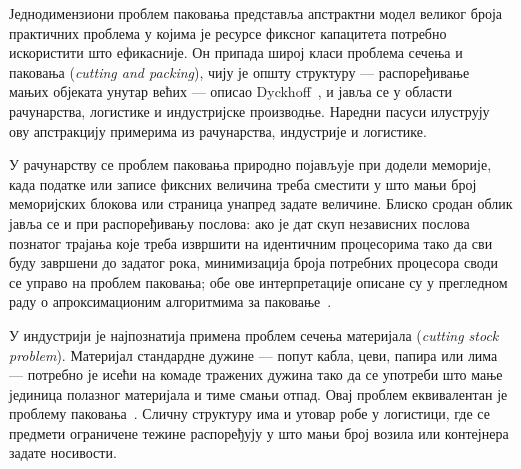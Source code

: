 Једнодимензиони проблем паковања представља апстрактни модел великог броја практичних
проблема у којима је ресурсе фиксног капацитета потребно искористити што ефикасније. Он
припада широј класи проблема сечења и паковања
(\foreignlanguage{english}{\emph{cutting and packing}}), чију је општу структуру ---
распоређивање мањих објеката унутар већих --- описао Dyckhoff~\cite{dyckhoff1990}, и јавља
се у области рачунарства, логистике и индустријске производње. Наредни пасуси илуструју ову апстракцију примерима из рачунарства, индустрије
и логистике.

У рачунарству се проблем паковања природно појављује при додели меморије, када податке
или записе фиксних величина треба сместити у што мањи број меморијских блокова или
страница унапред задате величине. Блиско сродан облик јавља се и при распоређивању
послова: ако је дат скуп независних послова познатог трајања које треба извршити на
идентичним процесорима тако да сви буду завршени до задатог рока, минимизација броја
потребних процесора своди се управо на проблем паковања; обе ове интерпретације описане
су у прегледном раду о апроксимационим алгоритмима за паковање~\cite{coffman1984}.

У индустрији је најпознатија примена проблем сечења материјала
(\foreignlanguage{english}{\emph{cutting stock problem}}). Материјал стандардне дужине
--- попут кабла, цеви, папира или лима --- потребно је исећи на комаде тражених дужина
тако да се употреби што мање јединица полазног материјала и тиме смањи отпад. Овај
проблем еквивалентан је проблему паковања~\cite{wascher1996,delorme2016}. Сличну
структуру има и утовар робе у логистици, где се предмети ограничене тежине распоређују у
што мањи број возила или контејнера задате носивости.

